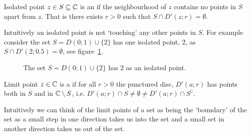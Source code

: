 \documentclass{article}
\newcommand{\discOpen}[2]{D\left({#1}; {#2}\right)}
\newcommand{\discPunctured}[2]{D'\left({#1}; {#2}\right)}
\newcommand{\intersection}{\cap}
\newcommand{\union}{\cup}
\begin{document}
    \begin{definition}{Isolated point}{}
        \(z\in S\subseteq\mathbb{C}\) is an  if the neighbourhood of \(z\) contains no points in \(S\) apart from \(z\).
        That is there exists \(r > 0\) such that \(S\intersection \discPunctured{z}{r} = \emptyset\).
    \end{definition}
    Intuitively an isolated point is not `touching' any other points in \(S\).
    For example consider the set \(S = \discOpen{0}{1}\union\{2\}\) has one isolated point, \(2\), as \(S\intersection\discPunctured{2}{0.5} = \emptyset\), see figure~\ref{fig:isolated point}.
    \begin{figure}[ht]
        \centering
        \tikzexternalenable
        \tikzexternaldisable
        \caption{The set \(S = \discOpen{0}{1}\union \{2\}\) has 2 as an isolated point.}
        \label{fig:isolated point}
    \end{figure}
    \begin{definition}{Limit point}{}
        \(z\in \mathbb{C}\) is a  if for all \(r > 0\) the punctured disc, \(\discPunctured{a}{r}\) has points both in \(S\) and in \(\mathbb{C}\setminus S\), i.e. \(\discPunctured{a}{r}\intersection S \ne \emptyset \ne \discPunctured{a}{r}\intersection S^{\complement}\).
    \end{definition}
    Intuitively we can think of the limit points of a set as being the `boundary' of the set as a small step in one direction takes us into the set and a small set in another direction takes us out of the set.
\end{document}
